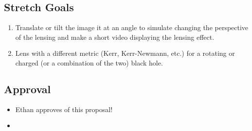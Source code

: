 \documentclass{article}
\begin{document}
\subsection*{Stretch Goals}
\begin{enumerate}
	\item Translate or tilt the image it at an angle to simulate changing the perspective of the lensing and make a short video displaying the lensing effect.
	\item Lens with a different metric (Kerr, Kerr-Newmann, etc.) for a rotating or charged (or a combination of the two) black hole. 
\end{enumerate}

\subsection*{Approval}
\begin{itemize}
	\item Ethan approves of this proposal!
	\item 
\end{itemize}
	
	
	
	
\end{document}

